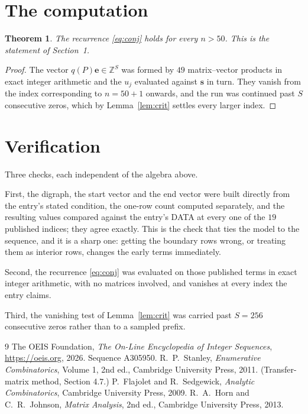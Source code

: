 \documentclass[11pt,a4paper]{article}
\theoremstyle{plain}
\newtheorem{theorem}{Theorem}
\theoremstyle{definition}
\begin{document}
\section{The computation}

\begin{theorem}
The recurrence \eqref{eq:conj} holds for every $n>50$. This is the statement of
Section~1.
\end{theorem}

\begin{proof}
The vector $q(P)\mathbf{e}\in\mathbb{Z}^{S}$ was formed by $49$ matrix--vector
products in exact integer arithmetic and the $u_j$ evaluated against $\mathbf{s}$ in turn.
They vanish from the index corresponding to $n=50+1$ onwards, and the run was continued
past $S$ consecutive zeros, which by Lemma~\ref{lem:crit} settles every larger index.
\end{proof}

\section{Verification}

Three checks, each independent of the algebra above.

First, the digraph, the start vector and the end vector were built directly from the
entry's stated condition, the one-row count computed separately, and the resulting values
compared against the entry's DATA at every one of the $19$ published indices; they
agree exactly. This is the check that ties the model to the sequence, and it is a sharp one:
getting the boundary rows wrong, or treating them as interior rows, changes the early terms
immediately.

Second, the recurrence \eqref{eq:conj} was evaluated on those published terms in exact
integer arithmetic, with no matrices involved, and vanishes at every index the entry claims.

Third, the vanishing test of Lemma~\ref{lem:crit} was carried past $S=256$ consecutive
zeros rather than to a sampled prefix.

\begin{thebibliography}{9}
 The OEIS Foundation, \emph{The On-Line Encyclopedia of Integer
Sequences}, \url{https://oeis.org}, 2026. Sequence A305950.
 R.~P.~Stanley, \emph{Enumerative Combinatorics}, Volume 1, 2nd ed.,
Cambridge University Press, 2011. (Transfer-matrix method, Section 4.7.)
 P.~Flajolet and R.~Sedgewick, \emph{Analytic Combinatorics}, Cambridge
University Press, 2009.
 R.~A.~Horn and C.~R.~Johnson, \emph{Matrix Analysis}, 2nd ed., Cambridge
University Press, 2013.
\end{thebibliography}
\end{document}
